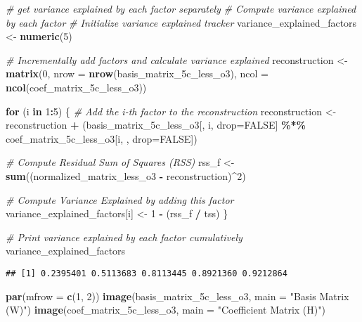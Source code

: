 \documentclass[
]{article}
\newenvironment{Shaded}{\begin{snugshade}}{\end{snugshade}}
\newcommand{\AttributeTok}[1]{\textcolor[rgb]{0.13,0.29,0.53}{#1}}
\newcommand{\CommentTok}[1]{\textcolor[rgb]{0.56,0.35,0.01}{\textit{#1}}}
\newcommand{\ConstantTok}[1]{\textcolor[rgb]{0.56,0.35,0.01}{#1}}
\newcommand{\ControlFlowTok}[1]{\textcolor[rgb]{0.13,0.29,0.53}{\textbf{#1}}}
\newcommand{\DecValTok}[1]{\textcolor[rgb]{0.00,0.00,0.81}{#1}}
\newcommand{\FunctionTok}[1]{\textcolor[rgb]{0.13,0.29,0.53}{\textbf{#1}}}
\newcommand{\NormalTok}[1]{#1}
\newcommand{\OtherTok}[1]{\textcolor[rgb]{0.56,0.35,0.01}{#1}}
\newcommand{\SpecialCharTok}[1]{\textcolor[rgb]{0.81,0.36,0.00}{\textbf{#1}}}
\newcommand{\StringTok}[1]{\textcolor[rgb]{0.31,0.60,0.02}{#1}}
\begin{document}
\begin{Shaded}
\begin{Highlighting}[]
\CommentTok{\# get variance explained by each factor separately}
\CommentTok{\# Compute variance explained by each factor}
\CommentTok{\# Initialize variance explained tracker}
\NormalTok{variance\_explained\_factors }\OtherTok{\textless{}{-}} \FunctionTok{numeric}\NormalTok{(}\DecValTok{5}\NormalTok{)}

\CommentTok{\# Incrementally add factors and calculate variance explained}
\NormalTok{reconstruction }\OtherTok{\textless{}{-}} \FunctionTok{matrix}\NormalTok{(}\DecValTok{0}\NormalTok{, }\AttributeTok{nrow =} \FunctionTok{nrow}\NormalTok{(basis\_matrix\_5c\_less\_o3), }\AttributeTok{ncol =} \FunctionTok{ncol}\NormalTok{(coef\_matrix\_5c\_less\_o3))}

\ControlFlowTok{for}\NormalTok{ (i }\ControlFlowTok{in} \DecValTok{1}\SpecialCharTok{:}\DecValTok{5}\NormalTok{) \{}
  \CommentTok{\# Add the i{-}th factor to the reconstruction}
\NormalTok{  reconstruction }\OtherTok{\textless{}{-}}\NormalTok{ reconstruction }\SpecialCharTok{+}\NormalTok{ (basis\_matrix\_5c\_less\_o3[, i, }\AttributeTok{drop=}\ConstantTok{FALSE}\NormalTok{] }\SpecialCharTok{\%*\%}\NormalTok{ coef\_matrix\_5c\_less\_o3[i, , }\AttributeTok{drop=}\ConstantTok{FALSE}\NormalTok{])}
  
  \CommentTok{\# Compute Residual Sum of Squares (RSS)}
\NormalTok{  rss\_f }\OtherTok{\textless{}{-}} \FunctionTok{sum}\NormalTok{((normalized\_matrix\_less\_o3 }\SpecialCharTok{{-}}\NormalTok{ reconstruction)}\SpecialCharTok{\^{}}\DecValTok{2}\NormalTok{)}
  
  \CommentTok{\# Compute Variance Explained by adding this factor}
\NormalTok{  variance\_explained\_factors[i] }\OtherTok{\textless{}{-}} \DecValTok{1} \SpecialCharTok{{-}}\NormalTok{ (rss\_f }\SpecialCharTok{/}\NormalTok{ tss)}
\NormalTok{\}}

\CommentTok{\# Print variance explained by each factor cumulatively}
\NormalTok{variance\_explained\_factors}
\end{Highlighting}
\end{Shaded}

\begin{verbatim}
## [1] 0.2395401 0.5113683 0.8113445 0.8921360 0.9212864
\end{verbatim}

\begin{Shaded}
\begin{Highlighting}[]
\FunctionTok{par}\NormalTok{(}\AttributeTok{mfrow =} \FunctionTok{c}\NormalTok{(}\DecValTok{1}\NormalTok{, }\DecValTok{2}\NormalTok{))}
\FunctionTok{image}\NormalTok{(basis\_matrix\_5c\_less\_o3, }\AttributeTok{main =} \StringTok{"Basis Matrix (W)"}\NormalTok{)}
\FunctionTok{image}\NormalTok{(coef\_matrix\_5c\_less\_o3, }\AttributeTok{main =} \StringTok{"Coefficient Matrix (H)"}\NormalTok{)}
\end{Highlighting}
\end{Shaded}
\end{document}
